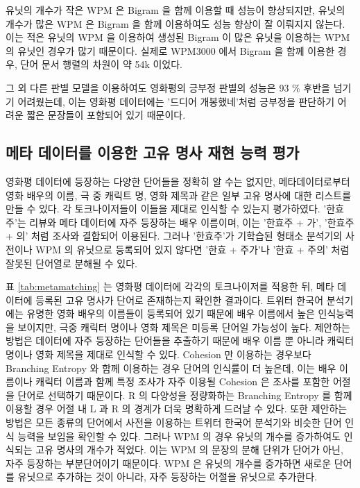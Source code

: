 \documentclass[oneside, ko,phd]{snuthesis_utf8_kor}
\begin{document}
유닛의 개수가 작은 WPM 은 Bigram 을 함께 이용할 때 성능이 향상되지만, 유닛의 개수가 많은 WPM 은 Bigram 을 함께 이용하여도 성능 향상이 잘 이뤄지지 않는다.
이는 적은 유닛의 WPM 을 이용하여 생성된 Bigram 이 많은 유닛을 이용하는 WPM 의 유닛인 경우가 많기 때문이다.
실제로 WPM3000 에서 Bigram 을 함께 이용한 경우, 단어 문서 행렬의 차원이 약 54k 이었다.

그 외 다른 판별 모델을 이용하여도 영화평의 긍부정 판별의 성능은 93 \% 후반을 넘기기 어려웠는데, 이는 영화평 데이터에는 '드디어 개봉했네'처럼 긍부정을 판단하기 어려운 짧은 문장들이 포함되어 있기 때문이다.


\subsection{메타 데이터를 이용한 고유 명사 재현 능력 평가}
영화평 데이터에 등장하는 다양한 단어들을 정확히 알 수는 없지만, 메타데이터로부터 영화 배우의 이름, 극 중 캐릭트 명, 영화 제목과 같은 일부 고유 명사에 대한 리스트를 만들 수 있다.
각 토크나이저들이 이들을 제대로 인식할 수 있는지 평가하였다.
'한효주'는 리뷰와 메타 데이터에 자주 등장하는 배우 이름이며, 이는 '한효주 + 가', '한효주 + 의' 처럼 조사와 결합되어 이용된다.
그러나 '한효주'가 기학습된 형태소 분석기의 사전이나 WPM 의 유닛으로 등록되어 있지 않다면 '한효 + 주가'나 '한효 + 주의' 처럼 잘못된 단어열로 분해될 수 있다.

표 \ref{tab:metamatching} 는 영화평 데이터에 각각의 토크나이저를 적용한 뒤, 메타 데이터에 등록된 고유 명사가 단어로 존재하는지 확인한 결과이다.
트위터 한국어 분석기에는 유명한 영화 배우의 이름들이 등록되어 있기 때문에 배우 이름에서 높은 인식능력을 보이지만, 극중 캐릭터 명이나 영화 제목은 미등록 단어일 가능성이 높다.
제안하는 방법은 데이터에 자주 등장하는 단어들을 추출하기 때문에 배우 이름 뿐 아니라 캐릭터 명이나 영화 제목을 제대로 인식할 수 있다.
Cohesion 만 이용하는 경우보다 Branching Entropy 와 함께 이용하는 경우 단어의 인식률이 더 높은데, 이는 배우 이름이나 캐릭터 이름과 함께 특정 조사가 자주 이용될 Cohesion 은 조사를 포함한 어절을 단어로 선택하기 때문이다.
R 의 다양성을 정량화하는 Branching Entropy 를 함께 이용할 경우 어절 내 L 과 R 의 경계가 더욱 명확하게 드러날 수 있다.
또한 제안하는 방법은 모든 종류의 단어에서 사전을 이용하는 트위터 한국어 분석기와 비슷한 단어 인식 능력을 보임을 확인할 수 있다.
그러나 WPM 의 경우 유닛의 개수를 증가하여도 인식되는 고유 명사의 개수가 적었다.
이는 WPM 의 문장의 분해 단위가 단어가 아닌, 자주 등장하는 부분단어이기 때문이다.
WPM 은 유닛의 개수를 증가하면 새로운 단어를 유닛으로 추가하는 것이 아니라, 자주 등장하는 어절을 유닛으로 추가한다.
\end{document}
